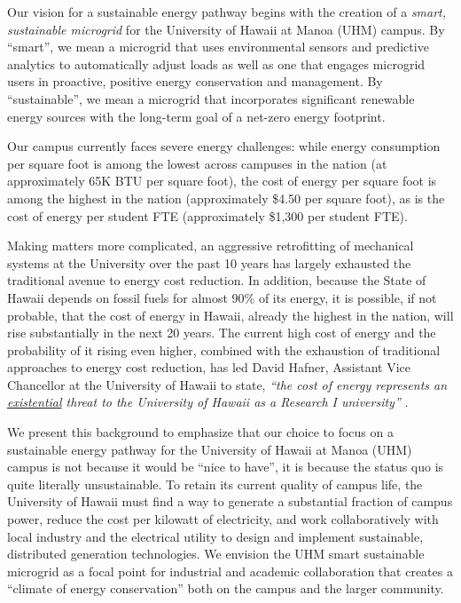 Our vision for a sustainable energy pathway begins with the creation of a
{\em smart, sustainable microgrid} for the University of Hawaii at Manoa
(UHM) campus.  By ``smart'', we mean a microgrid that uses environmental sensors
and predictive analytics to automatically adjust loads as well as one that
engages microgrid users in proactive, positive energy conservation and
management. By ``sustainable'', we mean a microgrid that incorporates
significant renewable energy sources with the long-term goal of a net-zero energy
footprint.

Our campus currently faces severe energy challenges: while energy
consumption per square foot is among the lowest across campuses in the
nation (at approximately 65K BTU per square foot), the cost of energy per
square foot is among the highest in the nation (approximately \$4.50 per
square foot), as is the cost of energy per student FTE (approximately
\$1,300 per student FTE).  

Making matters more complicated, an aggressive retrofitting of mechanical
systems at the University over the past 10 years has largely exhausted the
traditional avenue to energy cost reduction.  In addition, because the
State of Hawaii depends on fossil fuels for almost 90\% of its energy, it
is possible, if not probable, that the cost of energy in Hawaii, already
the highest in the nation, will rise substantially in the next 20
years. The current high cost of energy and the probability of it rising
even higher, combined with the exhaustion of traditional approaches to
energy cost reduction, has led David Hafner, Assistant Vice Chancellor
at the University of Hawaii to state, {\em ``the cost of energy represents
  an \underline{existential} threat to the University of Hawaii as a Research I
  university''} \cite{Hafner2011}.

We present this background to emphasize that our choice to focus on a
sustainable energy pathway for the University of Hawaii at Manoa (UHM)
campus is not because it would be ``nice to have'', it is because the
status quo is quite literally unsustainable.  To retain its current quality
of campus life, the University of Hawaii must find a way to generate a
substantial fraction of campus power, reduce the cost per kilowatt of
electricity, and work collaboratively with local industry and the
electrical utility to design and implement sustainable, distributed
generation technologies.  We envision the UHM smart sustainable microgrid as a
focal point for industrial and academic collaboration that creates a
``climate of energy conservation'' both on the campus and the larger
community.

